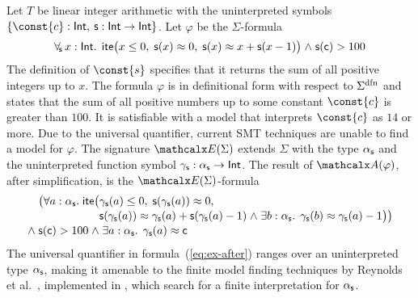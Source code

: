 \begin{example}
\label{ex:translation}
Let $T$ be linear integer arithmetic
with the uninterpreted symbols  $\{ \const{c} : { \typeint },\allowbreak\> \con{s} : { \typeint \rightarrow \typeint } \}$.
Let $\varphi$ be the $\Sigma$-formula
\begin{equation} \label{eq:ex-before}
\forallf{\con{s}} x : {\typeint}.\;\, \lite\bigl( x \leq 0,\; \con{s}(x) \teq 0,\;
  \con{s}( x ) \teq x + \con{s}( x - 1 ) \bigr) \wedge \con{s}( \con{c} ) > 100
\end{equation}
%
The definition of $\const{s}$ specifies that it returns the sum of all
positive integers up to $x$. The formula $\varphi$ is in definitional form with
respect to $\sfundefs{\Sigma}$
and states that the sum of all
positive numbers up to some constant $\const{c}$ is greater than $100$. It is
satisfiable with a model that interprets $\const{c}$ as $14$ or more.
Due to the universal quantifier,
current SMT techniques
are unable to find
a model for $\varphi$. The signature $\extendsig{\Sigma}$ extends $\Sigma$ with the type
$\alpha_{\mathsf{s}}$ and the uninterpreted function symbol $\gamma_{\mathsf{s}} : \alpha_{\mathsf{s}}
\rightarrow \mathsf{Int}$. The result of $\conv( \varphi )$, after simplification,
is the $\extendsig{\Sigma}$-formula
%
\begin{equation} \label{eq:ex-after}
\!\begin{aligned}[c]
  & \phantom{{\wedge}\; }\bigl(
      \forall a : \fargtype{\con{s}}.\; \lite\bigl(
        \!\begin{aligned}[t]
         &  \farg{\con{s}}( a ) \leq 0,\;
          \con{s}(\farg{\con{s}}( a )) \teq 0,\;
\\[-\jot]
  & \con{s}(\farg{\con{s}}( a )) \teq \farg{\con{s}}( a ) + \con{s}( \farg{\con{s}}( a )-1 )
    \wedge \exists b : {\fargtype{\con{s}}}.\;\, \farg{\con{s}}( b ) \teq \farg{\con{s}}( a )-1 \bigr) \bigr)
\end{aligned}
\\[-\jot]
 & {\wedge}\; \con{s}( \con{c} ) > 100 \wedge \exists a : {\fargtype{\con{s}}}.\;\, \farg{\con{s}}( a ) \teq \con{c}
\end{aligned}
\end{equation}
%
The universal quantifier in formula~(\ref{eq:ex-after}) ranges over an uninterpreted
type $\alpha_{\mathsf{s}}$, making it amenable to the finite model finding
techniques by Reynolds et al.\ \cite{ReyEtAl-1-RR-13,reynolds-et-al-2013},
implemented in \cvc, which search for a finite interpretation for $\alpha_{\mathsf{s}}$.

\end{example}
